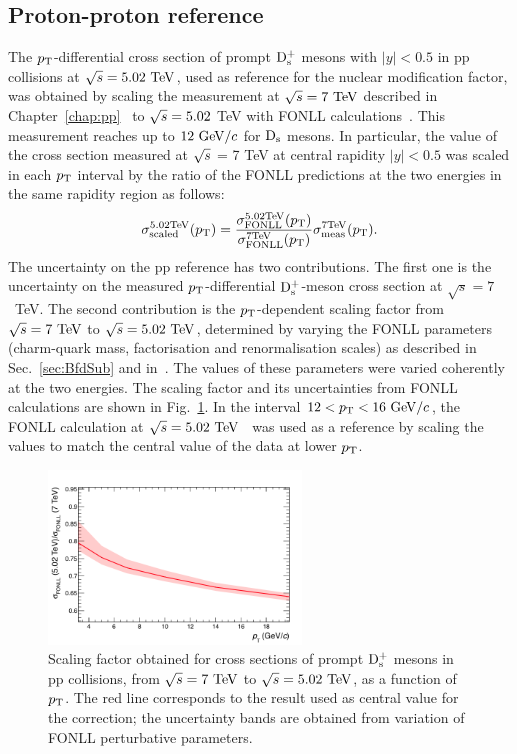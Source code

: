 \subsection{Proton-proton reference}
\label{sec:PPrefSyst}
The $p_{\rm T}$-differential cross section of prompt ${\rm D_s^+}$ mesons with 
$|y|<0.5$ in pp collisions at $\sqrt s=5.02~\mathrm{TeV}$, used as reference 
for the nuclear modification factor, was obtained by scaling the 
measurement at $\sqrt{s}=7~\mathrm{TeV}$ described in 
Chapter~\ref{chap:pp}~\cite{Acharya:2017jgo} to $\sqrt{s} = 5.02$ TeV 
with FONLL calculations~\cite{Cacciari:2012ny}. 
This measurement 
reaches up to $12~\mathrm{GeV}/c$ for ${\rm D_s}$ mesons.
In particular, the value of the cross section measured at $\sqrt{s}$ = 7 TeV 
at central rapidity $|y| < 0.5$ was scaled in each $p_{\rm T}$ interval by 
the ratio of the FONLL predictions at the two energies in the same rapidity region as follows:
\begin{equation}
\label{eq:scalingPP}
\sigma^{\rm 5.02 TeV}_{\rm scaled} (p_{\rm T}) = \frac{\sigma^{\rm 5.02 TeV}_{\rm FONLL} (p_{\rm T})}{\sigma^{\rm 7 TeV}_{\rm FONLL} (p_{\rm T})} \sigma^{\rm 7 TeV}_{\rm meas} (p_{\rm T}).
\end{equation}
The uncertainty on the pp reference 
has two contributions. The first one is the uncertainty on the measured 
$p_{\rm T}$-differential ${\rm D_s^+}$-meson cross section at $\sqrt s=7$~TeV.
The second contribution is the $p_{\rm T}$-dependent scaling factor 
from $\sqrt{s}=7~\mathrm{TeV}$ to $\sqrt{s}=5.02~\mathrm{TeV}$, determined by varying
the FONLL parameters (charm-quark mass, factorisation and renormalisation scales) 
as described in Sec.~\ref{sec:BfdSub} and in~\cite{Averbeck:2011ga}. The values of these parameters were 
varied coherently at the two energies. The scaling factor 
and its uncertainties from FONLL calculations are shown in Fig.~\ref{fig:FONLLscalFact}.
In the interval $12<p_{\rm T}<16~\mathrm{GeV}/c$, the FONLL calculation at 
$\sqrt s=5.02~\mathrm{TeV}$~\cite{Cacciari:2012ny} was used as a reference 
by scaling the values to match the central value of the data at lower $p_{\rm T}$. 
\begin{figure}[!h]
\centering
 \includegraphics[width=0.6\textwidth]{FigCap5/FONLLscaling7To5TeV.png}
 \caption{Scaling factor obtained for cross sections of prompt ${\rm D_s^+}$ mesons in pp collisions, from $\sqrt{s}=7~\mathrm{TeV}$ to $\sqrt{s}=5.02~\mathrm{TeV}$, as a function of $p_{\rm T}$. The red line corresponds to the result used as central value for the correction; the uncertainty bands are obtained from variation of FONLL perturbative parameters. }
 \label{fig:FONLLscalFact}
\end{figure}


